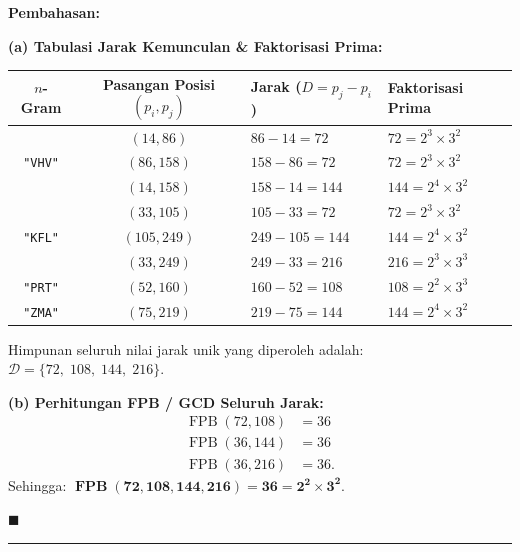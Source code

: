 \documentclass[11pt,a4paper]{article}
\newenvironment{solusi}{\noindent\textbf{\textsf{Pembahasan:}}\par\vspace{0.2em}}{\hfill$\blacksquare$\vspace{1em}\par\hrule\vspace{1em}}
\begin{document}
\begin{solusi}
\textbf{(a) Tabulasi Jarak Kemunculan \& Faktorisasi Prima:}
\begin{center}
\begin{tabular}{c c l l}
\toprule
\textbf{$n$-Gram} & \textbf{Pasangan Posisi $(p_i, p_j)$} & \textbf{Jarak ($D = p_j - p_i$)} & \textbf{Faktorisasi Prima} \\
\midrule
\multirow{3}{*}{\texttt{"VHV"}} & $(14, 86)$ & $86 - 14 = 72$ & $72 = 2^3 \times 3^2$ \\
                                & $(86, 158)$ & $158 - 86 = 72$ & $72 = 2^3 \times 3^2$ \\
                                & $(14, 158)$ & $158 - 14 = 144$ & $144 = 2^4 \times 3^2$ \\
\midrule
\multirow{3}{*}{\texttt{"KFL"}} & $(33, 105)$ & $105 - 33 = 72$ & $72 = 2^3 \times 3^2$ \\
                                & $(105, 249)$ & $249 - 105 = 144$ & $144 = 2^4 \times 3^2$ \\
                                & $(33, 249)$ & $249 - 33 = 216$ & $216 = 2^3 \times 3^3$ \\
\midrule
\texttt{"PRT"}                  & $(52, 160)$ & $160 - 52 = 108$ & $108 = 2^2 \times 3^3$ \\
\midrule
\texttt{"ZMA"}                  & $(75, 219)$ & $219 - 75 = 144$ & $144 = 2^4 \times 3^2$ \\
\bottomrule
\end{tabular}
\end{center}
Himpunan seluruh nilai jarak unik yang diperoleh adalah: $\mathcal{D} = \{72, \; 108, \; 144, \; 216\}$.

\vspace{0.2cm}
\textbf{(b) Perhitungan FPB / GCD Seluruh Jarak:}
\begin{align*}
\operatorname{FPB}(72, 108) &= 36 \\
\operatorname{FPB}(36, 144) &= 36 \\
\operatorname{FPB}(36, 216) &= 36.
\end{align*}
Sehingga: $\mathbf{\operatorname{FPB}(72, 108, 144, 216) = 36 = 2^2 \times 3^2}$.


\end{solusi}
\end{document}
